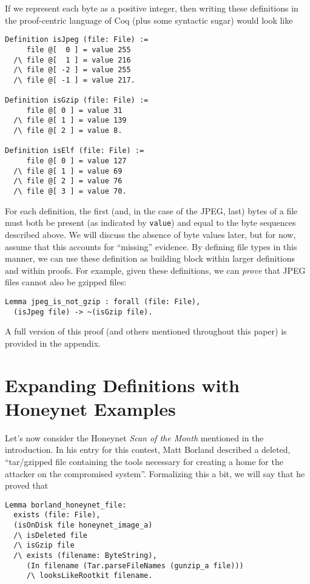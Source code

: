 \documentclass[nocopyrightspace]{sigplanconf}
\begin{document}
If we represent each byte as a positive integer, then writing these
definitions in the proof-centric language of Coq (plus some syntactic sugar)
would look like

\begin{lstlisting}
Definition isJpeg (file: File) :=
     file @[  0 ] = value 255
  /\ file @[  1 ] = value 216 
  /\ file @[ -2 ] = value 255
  /\ file @[ -1 ] = value 217.

Definition isGzip (file: File) :=
     file @[ 0 ] = value 31
  /\ file @[ 1 ] = value 139 
  /\ file @[ 2 ] = value 8.

Definition isElf (file: File) :=
     file @[ 0 ] = value 127
  /\ file @[ 1 ] = value 69 
  /\ file @[ 2 ] = value 76
  /\ file @[ 3 ] = value 70.
\end{lstlisting}

For each definition, the first (and, in the case of the JPEG, last) bytes of a
file must both be present (as indicated by {\tt value}) and equal to the byte
sequences described above. We will discuss the absence of byte values later,
but for now, assume that this accounts for ``missing'' evidence. By defining
file types in this manner, we can use these definition as building block
within larger definitions and within proofs. For example, given these
definitions, we can {\it prove} that JPEG files cannot also be gzipped files:

\begin{lstlisting}
Lemma jpeg_is_not_gzip : forall (file: File),
  (isJpeg file) -> ~(isGzip file).
\end{lstlisting}

A full version of this proof (and others mentioned throughout this paper) is
provided in the appendix.

\section{Expanding Definitions with Honeynet Examples}

Let's now consider the Honeynet {\it Scan of the Month} mentioned in the
introduction. In his entry for this contest, Matt 
Borland\cite{borland-honeynet} described a deleted, ``tar/gzipped file
containing the tools necessary for creating a home for the attacker on the
compromised system''. Formalizing this a bit, we will say that he proved that

\begin{lstlisting}
Lemma borland_honeynet_file:
  exists (file: File),
  (isOnDisk file honeynet_image_a)
  /\ isDeleted file
  /\ isGzip file
  /\ exists (filename: ByteString),
     (In filename (Tar.parseFileNames (gunzip_a file)))
     /\ looksLikeRootkit filename.
\end{lstlisting}
\end{document}
